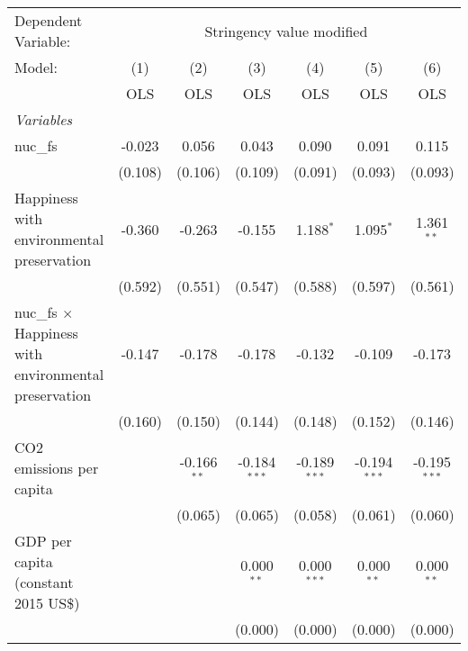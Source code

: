 
\begingroup
\centering
\begin{tabular}{lcccccc}
   \toprule
   Dependent Variable: & \multicolumn{6}{c}{Stringency value modified}\\
   Model:                                                       & (1)     & (2)           & (3)            & (4)            & (5)            & (6)\\  
                                                                &  OLS    & OLS           & OLS            & OLS            & OLS            & OLS\\  
   \midrule
   \emph{Variables}\\
   nuc\_fs                                                      & -0.023  & 0.056         & 0.043          & 0.090          & 0.091          & 0.115\\   
                                                                & (0.108) & (0.106)       & (0.109)        & (0.091)        & (0.093)        & (0.093)\\   
   Happiness with environmental preservation                    & -0.360  & -0.263        & -0.155         & 1.188$^{*}$    & 1.095$^{*}$    & 1.361$^{**}$\\   
                                                                & (0.592) & (0.551)       & (0.547)        & (0.588)        & (0.597)        & (0.561)\\   
   nuc\_fs $\times$ Happiness with environmental preservation   & -0.147  & -0.178        & -0.178         & -0.132         & -0.109         & -0.173\\   
                                                                & (0.160) & (0.150)       & (0.144)        & (0.148)        & (0.152)        & (0.146)\\   
   CO2 emissions per capita                                     &         & -0.166$^{**}$ & -0.184$^{***}$ & -0.189$^{***}$ & -0.194$^{***}$ & -0.195$^{***}$\\   
                                                                &         & (0.065)       & (0.065)        & (0.058)        & (0.061)        & (0.060)\\   
   GDP per capita (constant 2015 US\$)                          &         &               & 0.000$^{**}$   & 0.000$^{***}$  & 0.000$^{**}$   & 0.000$^{**}$\\   
                                                                &         &               & (0.000)        & (0.000)        & (0.000)        & (0.000)\\   

\end{tabular}
